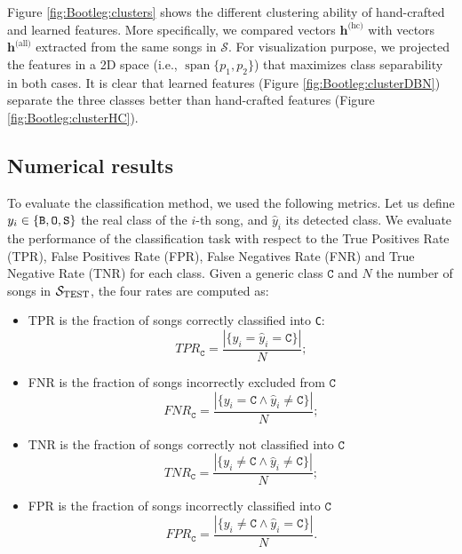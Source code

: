 Figure \ref{fig:Bootleg:clusters} shows the different clustering ability of hand-crafted and learned features. More specifically, we compared  vectors $\mathbf{h}^\text{(hc)}$ with vectors $\mathbf{h}^\text{(all)}$ extracted from the same songs in $\mathcal{S}$. For visualization purpose, we projected the features in a 2D space (i.e., $\operatorname{span}\{p_1, p_2\}$) that maximizes class separability in both cases. It is clear that learned features (Figure \ref{fig:Bootleg:clusterDBN}) separate the three classes better than hand-crafted features (Figure \ref{fig:Bootleg:clusterHC}).


\subsection{Numerical results}\label{sec:Bootleg:results}
To evaluate the classification method, we used the following metrics. Let us define $y_i \in \{\texttt{B}, \texttt{O}, \texttt{S} \}$ the real class of the $i$-th song, and $\hat{y}_i$ its detected class. We evaluate the performance of the classification task with respect to the True Positives Rate (TPR), False Positives Rate (FPR), False Negatives Rate (FNR) and True Negative Rate (TNR) for each class. Given a generic class $\texttt{C}$ and $N$ the number of songs in $\mathcal{S}_\text{TEST}$, the four rates are computed as:
\begin{itemize}
\item TPR is the fraction of songs correctly classified into \texttt{C}:
\begin{equation}
TPR_{\texttt{C}}=\frac{ |\{y_i = \hat{y}_i = \texttt{C} \}|}{N};
\end{equation}
\item FNR is the fraction of songs incorrectly excluded from $\texttt{C}$
\begin{equation}
FNR_{\texttt{C}}=\frac{ |\{y_i = \texttt{C} \land \hat{y}_i \neq \texttt{C} \}|}{N};
\end{equation}
\item TNR is the fraction of songs correctly not classified into $\texttt{C}$
\begin{equation}
TNR_{\texttt{C}}=\frac{ |\{y_i \neq \texttt{C} \land \hat{y}_i \neq \texttt{C} \}|}{N};
\end{equation}
\item FPR is the fraction of songs incorrectly classified into $\texttt{C}$
\begin{equation}
FPR_{\texttt{C}}=\frac{ |\{y_i \neq \texttt{C} \land \hat{y}_i = \texttt{C} \}|}{N}.
\end{equation}
\end{itemize}
